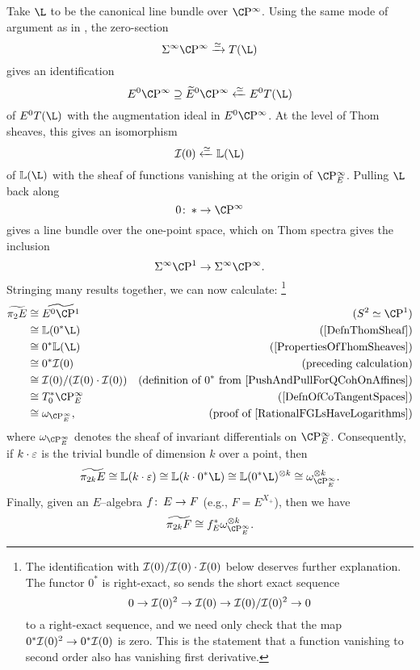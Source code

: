 \begin{example}\label{Pi2AndInvariantDiffls}
Take $\L$ to be the canonical line bundle over $\CP^\infty$.  Using the same mode of argument as in , the zero-section \[\Susp^\infty \CP^\infty \xrightarrow{\simeq} T(\L)\] gives an identification \[E^0 \CP^\infty \supseteq \widetilde E^0 \CP^\infty \xleftarrow{\simeq} E^0 T(\L)\] of $E^0 T(\L)$ with the augmentation ideal in $E^0 \CP^\infty$.  At the level of Thom sheaves, this gives an isomorphism \[\sheaf I(0) \xleftarrow{\simeq} \ThomSheaf{\L}\] of $\ThomSheaf{\L}$ with the sheaf of functions vanishing at the origin of $\CP^\infty_E$.  Pulling $\L$ back along \[0\co * \to \CP^\infty\] gives a line bundle over the one-point space, which on Thom spectra gives the inclusion \[\Susp^\infty \CP^1 \to \Susp^\infty \CP^\infty.\]  Stringing many results together, we can now calculate:
\footnote{The identification with $\mathcal{I}(0) / \mathcal{I}(0) \cdot \mathcal{I}(0)$ below deserves further explanation.  The functor $0^*$ is right-exact, so sends the short exact sequence \[0 \to \mathcal{I}(0)^2 \to \mathcal{I}(0) \to \mathcal{I}(0) / \mathcal{I}(0)^2 \to 0\] to a right-exact sequence, and we need only check that the map $0^* \mathcal{I}(0)^2 \to 0^* \mathcal{I}(0)$ is zero.  This is the statement that a function vanishing to second order also has vanishing first derivative.}
\begin{align*}
\widetilde{\pi_2 E} & \cong \widetilde{E^0 \CP^1} & \text{($S^2 \simeq \CP^1$)} \\
& \cong \ThomSheaf{0^* \L} & \text{(\Cref{DefnThomSheaf})} \\
& \cong 0^* \ThomSheaf{\L} & \text{(\Cref{PropertiesOfThomSheaves})} \\
& \cong 0^* \sheaf I(0) & \text{(preceding calculation)} \\
& \cong \sheaf I(0) / (\sheaf I(0) \cdot \sheaf I(0)) & \text{(definition of $0^*$ from \Cref{PushAndPullForQCohOnAffines})} \\
& \cong T^*_0 \CP^\infty_E & \text{(\Cref{DefnOfCoTangentSpaces})} \\
& \cong \omega_{\CP^\infty_E}, & \text{(proof of \Cref{RationalFGLsHaveLogarithms})}
\end{align*}
where $\omega_{\CP^\infty_E}$ denotes the sheaf of invariant differentials on $\CP^\infty_E$.  Consequently, if $k \cdot \varepsilon$ is the trivial bundle of dimension $k$ over a point, then \[\widetilde{\pi_{2k} E} \cong \ThomSheaf{k \cdot \eps} \cong \ThomSheaf{k \cdot 0^* \L} \cong \ThomSheaf{0^* \L}^{\otimes k} \cong \omega_{\CP^\infty_E}^{\otimes k}.\]  Finally, given an $E$--algebra $f \colon\thinspace E \to F$ (e.g., $F = E^{X_+}$), then we have \[\widetilde{\pi_{2k} F} \cong f_E^* \omega_{\CP^\infty_E}^{\otimes k}.\]
\end{example}

